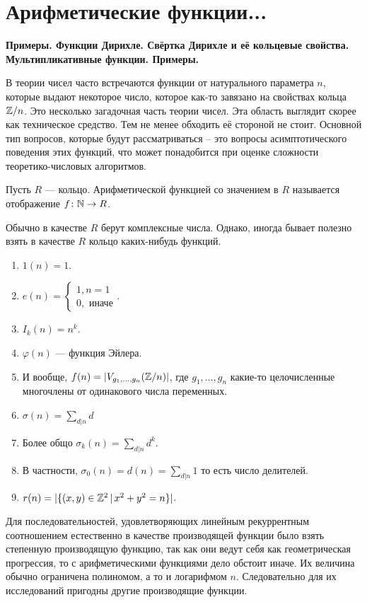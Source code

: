\section{
	Арифметические функции...  %
}

\textbf{Примеры. Функции Дирихле. Свёртка Дирихле и её кольцевые свойства. Мультипликативные функции. Примеры.}


В теории чисел часто встречаются функции от натурального параметра $n$, которые выдают некоторое число, которое как-то завязано на свойствах кольца $\mathbb{Z}/n$. Это несколько загадочная часть теории чисел. Эта область выглядит скорее как техническое средство. Тем не менее обходить её стороной не стоит. Основной тип вопросов, которые будут рассматриваться -- это вопросы асимптотического поведения этих функций, что может понадобится при оценке сложности теоретико-числовых алгоритмов.

 Пусть $R$ --- кольцо. Арифметической функцией со значением в $R$ называется отображение $f\colon \mathbb{N} \to R$.
\edfn

Обычно в качестве $R$ берут комплексные числа. Однако, иногда бывает полезно взять в качестве $R$ кольцо каких-нибудь функций.

\exm
\begin{enumerate}
\item $1(n)=1$.
\item $e(n)=\begin{cases} 1, n=1 \\ 0, \text{ иначе}\end{cases}.$
\item $I_k(n)=n^k$.
\item $\varphi(n)$ --- функция Эйлера.
\item И вообще, $f(n)=|V_{g_1,\dots,g_n}(\mathbb{Z}/n)|$, где $g_1,\dots,g_n$ какие-то целочисленные многочлены от одинакового числа переменных.
\item $\sigma(n)=\sum_{d|n}d$
\item Более общо $\sigma_k(n)=\sum_{d|n}d^k$.
\item В частности, $\sigma_0(n)=d(n)=\sum_{d|n} 1$ то есть число делителей.
\item $r(n)=|\{(x,y)\in \mathbb{Z}^2\,|\, x^2+y^2=n\}|$.
\end{enumerate}

Для последовательностей, удовлетворяющих линейным рекуррентным соотношением естественно в качестве производящей функции было взять степенную производящую функцию, так как они ведут себя как геометрическая прогрессия, то с арифметическими функциями дело обстоит иначе. Их величина обычно ограничена полиномом, а то и логарифмом $n$. Следовательно для их исследований пригодны другие производящие функции.

